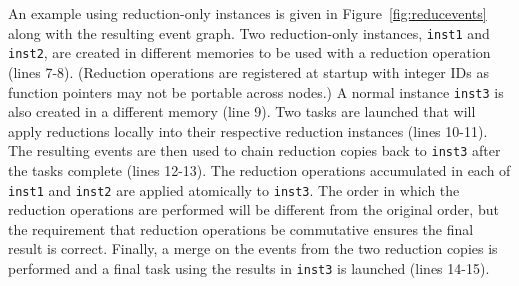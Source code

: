 

An example using reduction-only instances is given in Figure~\ref{fig:reducevents} along with the resulting event graph.
Two reduction-only instances, {\tt inst1} and {\tt inst2}, are created in different memories to
be used with a reduction operation (lines 7-8).  (Reduction operations are registered at startup with integer IDs
as function pointers may not be portable across nodes.)  A normal instance {\tt inst3}
is also created in a different memory (line 9).  Two tasks are launched that will apply
reductions locally into their respective reduction instances (lines 10-11).  The resulting
events are then used to chain reduction copies back to {\tt inst3} after the tasks complete (lines 12-13).
The reduction operations accumulated in each of {\tt inst1} and {\tt inst2} are applied atomically
to {\tt inst3}.  The order in which the reduction operations are performed will be different from
the original order, but the requirement that reduction operations be commutative ensures the final
result is correct.  Finally, a merge on the events from the two reduction copies is 
performed and a final task using the results in {\tt inst3} is launched (lines 14-15).


